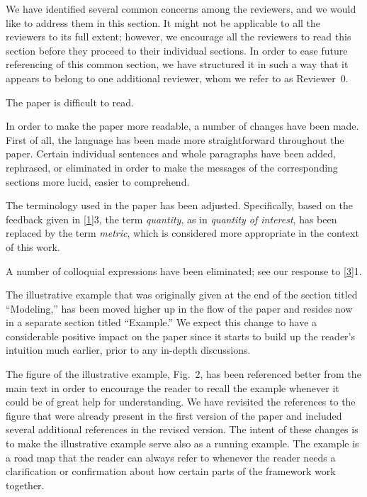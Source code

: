 We have identified several common concerns among the reviewers, and we would
like to address them in this section. It might not be applicable to all the
reviewers to its full extent; however, we encourage all the reviewers to read
this section before they proceed to their individual sections. In order to ease
future referencing of this common section, we have structured it in such a way
that it appears to belong to one additional reviewer, whom we refer to as
Reviewer~0.

\vspace{2em}

\begin{reviewer}
 The paper is difficult to read.
\end{reviewer}

\begin{authors}
In order to make the paper more readable, a number of changes have been made.
First of all, the language has been made more straightforward throughout the
paper. Certain individual sentences and whole paragraphs have been added,
rephrased, or eliminated in order to make the messages of the corresponding
sections more lucid, easier to comprehend.

The terminology used in the paper has been adjusted. Specifically, based on the
feedback given in \cref{1}{3}, the term \emph{quantity}, as in \emph{quantity of
interest}, has been replaced by the term \emph{metric}, which is considered more
appropriate in the context of this work.

A number of colloquial expressions have been eliminated; see our response to
\cref{3}{1}.

The illustrative example that was originally given at the end of the section
titled ``Modeling,'' has been moved higher up in the flow of the paper and
resides now in a separate section titled ``Example.'' We expect this change to
have a considerable positive impact on the paper since it starts to build up the
reader's intuition much earlier, prior to any in-depth discussions.

The figure of the illustrative example, Fig.~2, has been referenced better from
the main text in order to encourage the reader to recall the example whenever it
could be of great help for understanding. We have revisited the references to
the figure that were already present in the first version of the paper and
included several additional references in the revised version. The intent of
these changes is to make the illustrative example serve also as a running
example. The example is a road map that the reader can always refer to whenever
the reader needs a clarification or confirmation about how certain parts of the
framework work together.


\end{authors}
